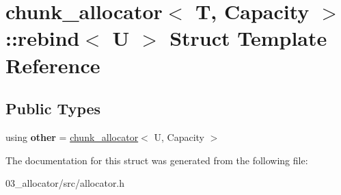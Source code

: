 \hypertarget{structchunk__allocator_1_1rebind}{}\section{chunk\+\_\+allocator$<$ T, Capacity $>$\+:\+:rebind$<$ U $>$ Struct Template Reference}
\label{structchunk__allocator_1_1rebind}
\subsection*{Public Types}
\begin{DoxyCompactItemize}
\item 
\mbox{\label{structchunk__allocator_1_1rebind_a5cee62fc1494e9199aeb86b8fbad762a}} 
using {\bfseries other} = \hyperlink{structchunk__allocator}{chunk\+\_\+allocator}$<$ U, Capacity $>$
\end{DoxyCompactItemize}


The documentation for this struct was generated from the following file\+:\begin{DoxyCompactItemize}
\item 
03\+\_\+allocator/src/allocator.\+h\end{DoxyCompactItemize}
